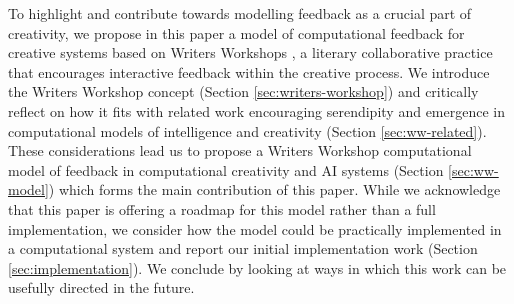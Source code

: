 To highlight and contribute towards modelling feedback as a crucial part of creativity, we propose in this paper a model of computational feedback for creative systems based on Writers Workshops \cite{gabriel2002writer}, a literary collaborative practice that encourages interactive feedback within the creative process. We introduce the Writers Workshop concept (Section \ref{sec:writers-workshop}) and critically  reflect on how it fits with related work encouraging serendipity and emergence in computational models of intelligence and creativity (Section \ref{sec:ww-related}). These considerations lead us to propose a Writers Workshop computational model of feedback in computational creativity and AI systems (Section \ref{sec:ww-model}) which forms the main contribution of this paper. 
While we acknowledge that this paper is offering a roadmap for this model rather than a full implementation, we consider how the model could be practically implemented in a computational system and report our initial implementation work (Section \ref{sec:implementation}). We conclude by looking at ways in which this work can be usefully directed in the future.



